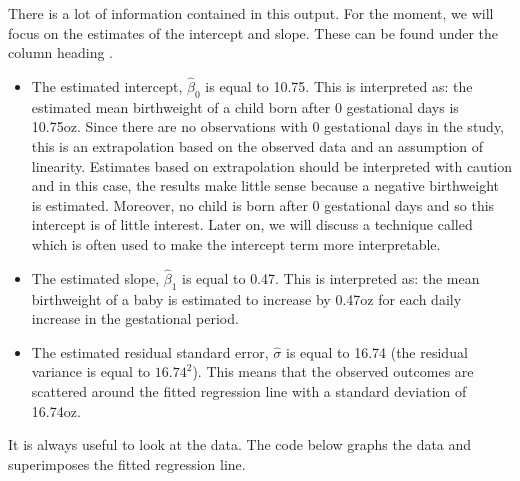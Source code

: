 \documentclass[letterpaper,10pt,english]{jupyterBook}
\begin{document}
\sphinxAtStartPar
There is a lot of information contained in this output. For the moment, we will focus on the estimates of the intercept and slope. These can be found under the column heading .
\begin{itemize}
\item {} 
\sphinxAtStartPar
The estimated intercept, \(\hat{\beta}_0\) is equal to \sphinxhyphen{}10.75. This is interpreted as: the estimated mean birthweight of a child born after 0 gestational days is \sphinxhyphen{}10.75oz. Since there are no observations with 0 gestational days in the study, this is an extrapolation based on the observed data and an assumption of linearity. Estimates based on extrapolation should be interpreted with caution and in this case, the results make little sense because a negative birthweight is estimated. Moreover, no child is born after 0 gestational days and so this intercept is of little interest. Later on, we will discuss a technique called  which is often used to make the intercept term more interpretable.

\item {} 
\sphinxAtStartPar
The estimated slope, \(\hat{\beta}_1\) is equal to 0.47. This is interpreted as: the mean birthweight of a baby is estimated to increase by 0.47oz for each daily increase in the gestational period.

\item {} 
\sphinxAtStartPar
The estimated residual standard error, \(\hat{\sigma}\) is equal to 16.74 (the residual variance is equal to \(16.74^2\)). This means that the observed outcomes are scattered around the fitted regression line with a standard deviation of 16.74oz.

\end{itemize}

\sphinxAtStartPar
It is always useful to look at the data. The code below graphs the data and superimposes the fitted regression line.

\begin{sphinxVerbatim}[commandchars=\\\{\}]
 
  
\end{sphinxVerbatim}
\end{document}
